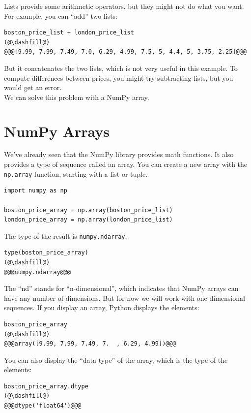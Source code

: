 Lists provide some arithmetic operators, but they might not do what you
want. For example, you can ``add'' two lists:

\begin{lstlisting}[]
boston_price_list + london_price_list
(@\dashfill@)
@@@[9.99, 7.99, 7.49, 7.0, 6.29, 4.99, 7.5, 5, 4.4, 5, 3.75, 2.25]@@@
\end{lstlisting}

But it concatenates the two lists, which is not very useful in this
example. To compute differences between prices, you might try
subtracting lists, but you would get an error.\\
We can solve this problem with a NumPy array.

\hypertarget{numpy-arrays}{%
\section{NumPy Arrays}\label{numpy-arrays}}

We've already seen that the NumPy library provides math functions. It
also provides a type of sequence called an array. You can create a new
array with the \passthrough{\lstinline!np.array!} function, starting
with a list or tuple.

\begin{lstlisting}[]
import numpy as np

boston_price_array = np.array(boston_price_list)
london_price_array = np.array(london_price_list)
\end{lstlisting}

The type of the result is \passthrough{\lstinline!numpy.ndarray!}.

\begin{lstlisting}[]
type(boston_price_array)
(@\dashfill@)
@@@numpy.ndarray@@@
\end{lstlisting}

The ``nd'' stands for ``n-dimensional'', which indicates that NumPy
arrays can have any number of dimensions. But for now we will work with
one-dimensional sequences. If you display an array, Python displays the
elements:

\begin{lstlisting}[]
boston_price_array
(@\dashfill@)
@@@array([9.99, 7.99, 7.49, 7.  , 6.29, 4.99])@@@
\end{lstlisting}

You can also display the ``data type'' of the array, which is the type
of the elements:

\begin{lstlisting}[]
boston_price_array.dtype
(@\dashfill@)
@@@dtype('float64')@@@
\end{lstlisting}

